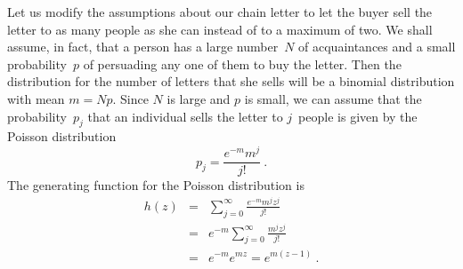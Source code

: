 \begin{example}
Let us modify the assumptions about our chain letter to let the buyer sell the
letter to as many people as she can instead of to a maximum of two.  We shall
assume, in fact, that a person has a large number~$N$ of acquaintances and a
small probability~$p$ of persuading any one of them to buy the letter.  Then
the distribution for the number of letters that she sells will be a binomial
distribution with mean $m = Np$.  Since $N$ is large and $p$ is small, we can
assume that the probability~$p_j$ that an individual sells the letter to
$j$~people is given by the Poisson distribution
$$
p_j = \frac{e^{-m} m^j}{j!}\ .
$$
\newpage
\noindent
The generating function for the Poisson distribution is
\begin{eqnarray*}
h(z) &=& \sum_{j = 0}^\infty \frac{e^{-m} m^j z^j}{j!} \\
     &=& e^{-m} \sum_{j = 0}^\infty \frac{m^j z^j}{j!} \\
     &=& e^{-m} e^{mz} = e^{m(z - 1)}\ .
\end{eqnarray*}


\end{example}

